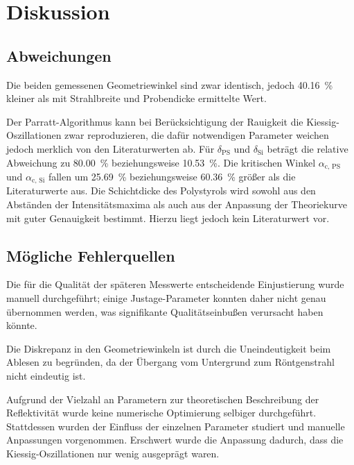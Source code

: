 \section{Diskussion}
\label{sec:diskussion}

\subsection{Abweichungen}
Die beiden gemessenen Geometriewinkel sind zwar identisch,
jedoch \SI{40.16}{\percent} kleiner als mit Strahlbreite und Probendicke ermittelte Wert.

Der Parratt-Algorithmus kann bei Berücksichtigung der Rauigkeit
die Kiessig-Oszillationen zwar reproduzieren,
die dafür notwendigen Parameter weichen jedoch merklich von den Literaturwerten ab.
Für $\delta_\text{PS}$ und $\delta_\text{Si}$ beträgt die relative Abweichung zu \cite{versuchsanleitung}
\SI{80.00}{\percent} beziehungsweise \SI{10.53}{\percent}.
Die kritischen Winkel $\alpha_\text{c, PS}$ und $\alpha_\text{c, Si}$
fallen um \SI{25.69}{\percent} beziehungsweise \SI{60.36}{\percent} größer als die Literaturwerte \cite{versuchsanleitung} aus.
Die Schichtdicke des Polystyrols wird
    sowohl aus den Abständen der Intensitätsmaxima
    als auch aus der Anpassung der Theoriekurve
mit guter Genauigkeit bestimmt.
Hierzu liegt jedoch kein Literaturwert vor.


\subsection{Mögliche Fehlerquellen}
Die für die Qualität der späteren Messwerte entscheidende Einjustierung
wurde manuell durchgeführt;
einige Justage-Parameter konnten daher nicht genau übernommen werden,
was signifikante Qualitätseinbußen verursacht haben könnte.

Die Diskrepanz in den Geometriewinkeln ist durch die Uneindeutigkeit beim Ablesen zu begründen,
da der Übergang vom Untergrund zum Röntgenstrahl nicht eindeutig ist.

Aufgrund der Vielzahl an Parametern zur theoretischen Beschreibung der Reflektivität
wurde keine numerische Optimierung selbiger durchgeführt.
Stattdessen wurden der Einfluss der einzelnen Parameter studiert
und manuelle Anpassungen vorgenommen.
Erschwert wurde die Anpassung dadurch,
dass die Kiessig-Oszillationen nur wenig ausgeprägt waren.

